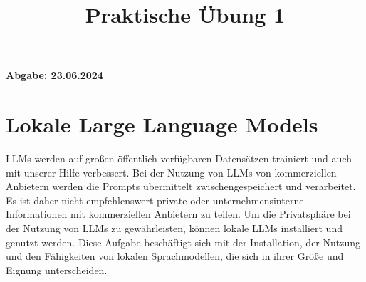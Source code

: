 \documentclass[12pt,ngerman]{AssignmentClass}
\title{Praktische Übung 1} %
\begin{document}
	\maketitle

    \noindent %
    \begin{tcolorbox}[colback=gray!20, %
                      colframe=gray!20, %
                      boxrule=0pt, %
                      sharp corners, %
                      valign=center, %
                      halign=center, %
                      height=2cm] %
    \LARGE \bfseries Abgabe: 23.06.2024 %
    \end{tcolorbox}

    
    \section{Lokale Large Language Models}
        LLMs werden auf großen öffentlich verfügbaren Datensätzen trainiert und auch mit unserer Hilfe verbessert. Bei der Nutzung von LLMs von kommerziellen Anbietern werden die Prompts übermittelt zwischengespeichert und verarbeitet. Es ist daher nicht empfehlenswert private oder unternehmensinterne Informationen mit kommerziellen Anbietern zu teilen.
Um die Privatsphäre bei der Nutzung von LLMs zu gewährleisten, können lokale LLMs installiert und genutzt werden. Diese Aufgabe beschäftigt sich mit der Installation, der Nutzung und den Fähigkeiten von lokalen Sprachmodellen, die sich in ihrer Größe und Eignung unterscheiden. 
\end{document}

